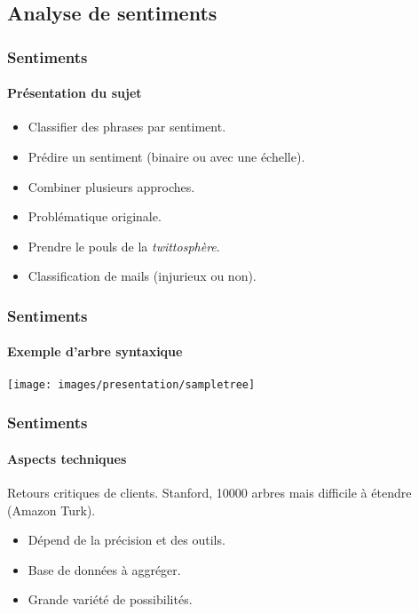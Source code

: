 \subsection{Analyse de sentiments}
\begin{frame}
	\frametitle{Sentiments}
	\framesubtitle{Présentation du sujet}
		\begin{itemize}
			\item Classifier des phrases par sentiment.
			\item Prédire un sentiment (binaire ou avec une échelle).
		\end{itemize}

		\begin{itemize}
			\item Combiner plusieurs approches.
			\item Problématique \og originale\fg.
		\end{itemize}

		\begin{itemize}
			\item Prendre le pouls de la \textit{twittosphère}.
			\item Classification de mails (injurieux ou non).
		\end{itemize}
\end{frame}

\begin{frame}
	\frametitle{Sentiments}
	\framesubtitle{Exemple d'arbre syntaxique}
	\texttt{[image: images/presentation/sampletree]}
\end{frame}

\begin{frame}
	\frametitle{Sentiments}
	\framesubtitle{Aspects techniques}
		\begin{itemize}
			Retours critiques de clients.
			Stanford, 10000 arbres mais difficile à étendre (Amazon Turk).
		\end{itemize}

	\paraTitle{Complexité}
		\begin{itemize}
			\item Dépend de la précision et des outils.
			\item Base de données à aggréger.
			\item Grande variété de possibilités.
		\end{itemize}		
\end{frame}